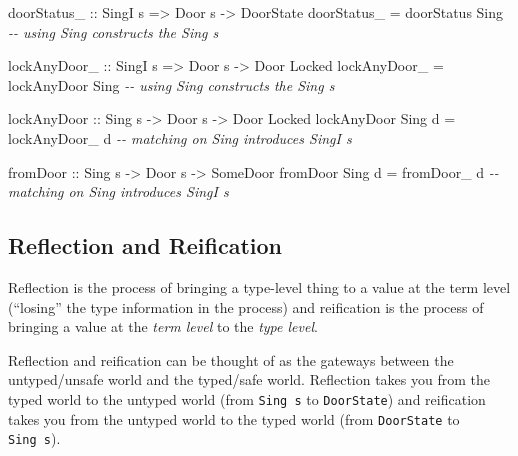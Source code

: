 \documentclass[]{article}
\newenvironment{Shaded}{}{}
\newcommand{\CommentTok}[1]{\textcolor[rgb]{0.38,0.63,0.69}{\textit{#1}}}
\newcommand{\DataTypeTok}[1]{\textcolor[rgb]{0.56,0.13,0.00}{#1}}
\newcommand{\NormalTok}[1]{#1}
\newcommand{\OtherTok}[1]{\textcolor[rgb]{0.00,0.44,0.13}{#1}}
\begin{document}
\begin{Shaded}
\begin{Highlighting}[]
\OtherTok{doorStatus\_ ::} \DataTypeTok{SingI}\NormalTok{ s }\OtherTok{=\textgreater{}} \DataTypeTok{Door}\NormalTok{ s }\OtherTok{{-}\textgreater{}} \DataTypeTok{DoorState}
\NormalTok{doorStatus\_ }\OtherTok{=}\NormalTok{ doorStatus }\DataTypeTok{Sing}           \CommentTok{{-}{-} using Sing constructs the Sing s}

\OtherTok{lockAnyDoor\_ ::} \DataTypeTok{SingI}\NormalTok{ s }\OtherTok{=\textgreater{}} \DataTypeTok{Door}\NormalTok{ s }\OtherTok{{-}\textgreater{}} \DataTypeTok{Door} \DataTypeTok{\textquotesingle{}Locked}
\NormalTok{lockAnyDoor\_ }\OtherTok{=}\NormalTok{ lockAnyDoor }\DataTypeTok{Sing}         \CommentTok{{-}{-} using Sing constructs the Sing s}

\OtherTok{lockAnyDoor ::} \DataTypeTok{Sing}\NormalTok{ s }\OtherTok{{-}\textgreater{}} \DataTypeTok{Door}\NormalTok{ s }\OtherTok{{-}\textgreater{}} \DataTypeTok{Door} \DataTypeTok{\textquotesingle{}Locked}
\NormalTok{lockAnyDoor }\DataTypeTok{Sing}\NormalTok{ d }\OtherTok{=}\NormalTok{ lockAnyDoor\_ d     }\CommentTok{{-}{-} matching on Sing introduces SingI s}

\OtherTok{fromDoor ::} \DataTypeTok{Sing}\NormalTok{ s }\OtherTok{{-}\textgreater{}} \DataTypeTok{Door}\NormalTok{ s }\OtherTok{{-}\textgreater{}} \DataTypeTok{SomeDoor}
\NormalTok{fromDoor }\DataTypeTok{Sing}\NormalTok{ d }\OtherTok{=}\NormalTok{ fromDoor\_ d           }\CommentTok{{-}{-} matching on Sing introduces SingI s}
\end{Highlighting}
\end{Shaded}

\subsection{Reflection and Reification}\label{reflection-and-reification}

Reflection is the process of bringing a type-level thing to a value at the term
level (``losing'' the type information in the process) and reification is the
process of bringing a value at the \emph{term level} to the \emph{type level}.

Reflection and reification can be thought of as the gateways between the
untyped/unsafe world and the typed/safe world. Reflection takes you from the
typed world to the untyped world (from \texttt{Sing\ s} to \texttt{DoorState})
and reification takes you from the untyped world to the typed world (from
\texttt{DoorState} to \texttt{Sing\ s}).
\end{document}
